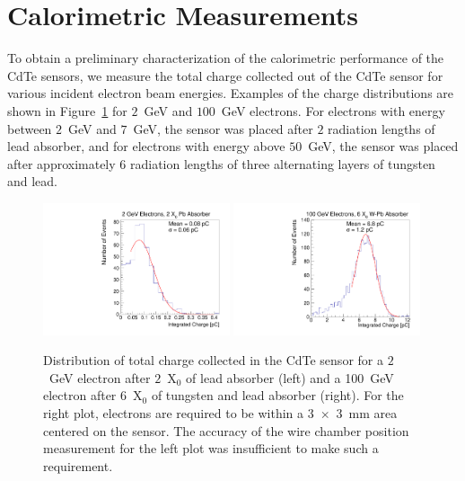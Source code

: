 
\section{Calorimetric Measurements} 
\label{sec:calorimetery} 

To obtain a preliminary characterization of the calorimetric performance 
of the CdTe sensors, we measure the total charge collected out of the CdTe 
sensor for various incident electron beam energies. Examples of the 
charge distributions are shown in Figure~\ref{fig:ChargeDistribution}
for $2$~GeV and $100$~GeV electrons. For electrons with energy between 
$2$~GeV and $7$~GeV, the sensor was placed after $2$ radiation lengths 
of lead absorber, and for electrons with energy above $50$~GeV, the 
sensor was placed after approximately $6$ radiation lengths of three alternating layers of 
tungsten and lead. 

\begin{figure}[htbp] 
\centering
\includegraphics[width=0.49\textwidth]{figures/2GeV_charge.pdf} 
\includegraphics[width=0.49\textwidth]{figures/100GeV_charge.pdf} 
\caption{Distribution of total charge collected in the CdTe sensor for a $2$~GeV
electron after $2$~$\mathrm{X}_{0}$ of lead absorber (left) and a 100~GeV
electron after $6$~$\mathrm{X}_{0}$ of tungsten and lead absorber (right). 
For the right plot, electrons are required to be within a 3~$\times$~3~mm 
area centered on the sensor. The accuracy of the wire chamber position 
measurement for the left plot was insufficient to make such a requirement.} 
\label{fig:ChargeDistribution} 
\end{figure} 

